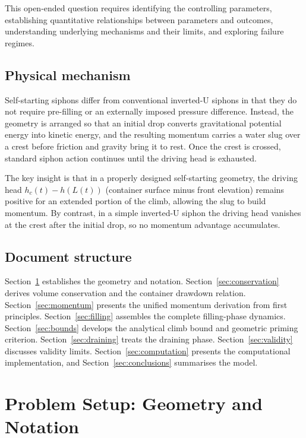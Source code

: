 \documentclass[11pt]{article}
\theoremstyle{definition}
\begin{document}
This open-ended question requires identifying the controlling parameters, establishing 
quantitative relationships between parameters and outcomes, understanding underlying 
mechanisms and their limits, and exploring failure regimes.

\subsection{Physical mechanism}

Self-starting siphons differ from conventional inverted-U siphons in that they do not require 
pre-filling or an externally imposed pressure difference. Instead, the geometry is arranged 
so that an initial drop converts gravitational potential energy into kinetic energy, and the 
resulting momentum carries a water slug over a crest before friction and gravity bring it to 
rest. Once the crest is crossed, standard siphon action continues until the driving head is 
exhausted.

The key insight is that in a properly designed self-starting geometry, the driving head 
$h_c(t) - h(L(t))$ (container surface minus front elevation) remains positive for an extended 
portion of the climb, allowing the slug to build momentum. By contrast, in a simple inverted-U 
siphon the driving head vanishes at the crest after the initial drop, so no momentum advantage 
accumulates.

\subsection{Document structure}

Section~\ref{sec:setup} establishes the geometry and notation. Section~\ref{sec:conservation} 
derives volume conservation and the container drawdown relation. Section~\ref{sec:momentum} 
presents the unified momentum derivation from first principles. Section~\ref{sec:filling} 
assembles the complete filling-phase dynamics. Section~\ref{sec:bounds} develops the 
analytical climb bound and geometric priming criterion. Section~\ref{sec:draining} treats 
the draining phase. Section~\ref{sec:validity} discusses validity limits. 
Section~\ref{sec:computation} presents the computational implementation, and 
Section~\ref{sec:conclusions} summarises the model.

\section{Problem Setup: Geometry and Notation}
\label{sec:setup}
\end{document}
